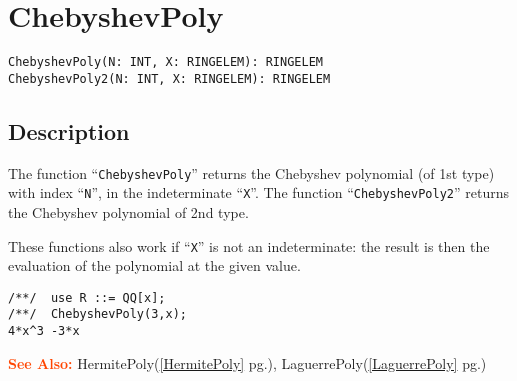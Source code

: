 \documentclass[a4paper]{mybook}
\newenvironment{command}{}{} %
\newcommand\SeeAlso{\par\textcolor{OrangeRed}{\textbf{\large See Also: }}}
\begin{document}
\section{ChebyshevPoly}
\label{ChebyshevPoly}
\begin{command} %


\begin{Verbatim}[label=syntax, rulecolor=\color{MidnightBlue},
frame=single]
ChebyshevPoly(N: INT, X: RINGELEM): RINGELEM
ChebyshevPoly2(N: INT, X: RINGELEM): RINGELEM
\end{Verbatim}


\subsection*{Description}

The function ``\verb&ChebyshevPoly&'' returns the Chebyshev polynomial (of 1st
type) with index ``\verb&N&'', in the indeterminate ``\verb&X&''.  The function
``\verb&ChebyshevPoly2&'' returns the Chebyshev polynomial of 2nd type.
\par 
These functions also work if ``\verb&X&'' is not an indeterminate: the result
is then the evaluation of the polynomial at the given value.
\begin{Verbatim}[label=example, rulecolor=\color{PineGreen}, frame=single]
/**/  use R ::= QQ[x];
/**/  ChebyshevPoly(3,x);
4*x^3 -3*x
\end{Verbatim}


\SeeAlso %
  HermitePoly(\ref{HermitePoly} pg.\pageref{HermitePoly}), 
    LaguerrePoly(\ref{LaguerrePoly} pg.\pageref{LaguerrePoly})
\end{command} %
\end{document}
